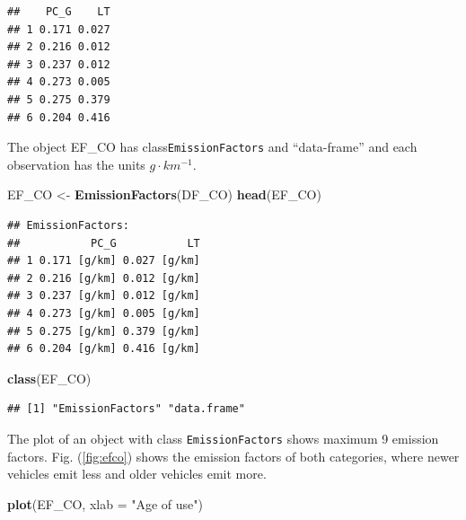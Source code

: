\documentclass[12pt,graybox,envcountchap,sectrefs]{krantz}
\makeatletter
\newenvironment{Shaded}{\begin{snugshade}}{\end{snugshade}}
\newcommand{\KeywordTok}[1]{\textcolor[rgb]{0.13,0.29,0.53}{\textbf{#1}}}
\newcommand{\DataTypeTok}[1]{\textcolor[rgb]{0.13,0.29,0.53}{#1}}
\newcommand{\StringTok}[1]{\textcolor[rgb]{0.31,0.60,0.02}{#1}}
\newcommand{\NormalTok}[1]{#1}
\newenvironment{kframe}{%
\medskip{}
\setlength{\fboxsep}{.8em}
 \def\at@end@of@kframe{}%
 \ifinner\ifhmode%
  \def\at@end@of@kframe{\end{minipage}}%
  \begin{minipage}{\columnwidth}%
 \fi\fi%
 \def\FrameCommand##1{\hskip\@totalleftmargin \hskip-\fboxsep
 \colorbox{shadecolor}{##1}\hskip-\fboxsep
     \hskip-\linewidth \hskip-\@totalleftmargin \hskip\columnwidth}%
 \MakeFramed {\advance\hsize-\width
   \@totalleftmargin\z@ \linewidth\hsize
   \@setminipage}}%
 {\par\unskip\endMakeFramed%
 \at@end@of@kframe}
\renewenvironment{Shaded}{\begin{kframe}}{\end{kframe}}
\theoremstyle{definition}
\theoremstyle{definition}
\theoremstyle{definition}
\theoremstyle{remark}
\makeatother
\begin{document}
\begin{verbatim}
##    PC_G    LT
## 1 0.171 0.027
## 2 0.216 0.012
## 3 0.237 0.012
## 4 0.273 0.005
## 5 0.275 0.379
## 6 0.204 0.416
\end{verbatim}

The object EF\_CO has class\texttt{EmissionFactors} and ``data-frame''
and each observation has the units \(g \cdot km^{-1}\).

\begin{Shaded}
\begin{Highlighting}[]
\NormalTok{EF_CO <-}\StringTok{ }\KeywordTok{EmissionFactors}\NormalTok{(DF_CO)}
\KeywordTok{head}\NormalTok{(EF_CO)}
\end{Highlighting}
\end{Shaded}

\begin{verbatim}
## EmissionFactors:
##           PC_G           LT
## 1 0.171 [g/km] 0.027 [g/km]
## 2 0.216 [g/km] 0.012 [g/km]
## 3 0.237 [g/km] 0.012 [g/km]
## 4 0.273 [g/km] 0.005 [g/km]
## 5 0.275 [g/km] 0.379 [g/km]
## 6 0.204 [g/km] 0.416 [g/km]
\end{verbatim}

\begin{Shaded}
\begin{Highlighting}[]
\KeywordTok{class}\NormalTok{(EF_CO)}
\end{Highlighting}
\end{Shaded}

\begin{verbatim}
## [1] "EmissionFactors" "data.frame"
\end{verbatim}

The plot of an object with class \texttt{EmissionFactors} shows maximum
9 emission factors. Fig. (\ref{fig:efco}) shows the emission factors of
both categories, where newer vehicles emit less and older vehicles emit
more.

\begin{Shaded}
\begin{Highlighting}[]
\KeywordTok{plot}\NormalTok{(EF_CO, }\DataTypeTok{xlab =} \StringTok{"Age of use"}\NormalTok{)}
\end{Highlighting}
\end{Shaded}
\end{document}

